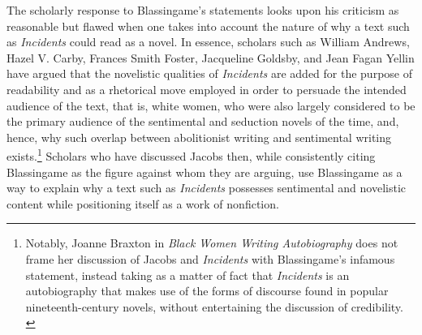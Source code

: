 The scholarly response to Blassingame's statements looks upon his criticism as reasonable but flawed when one takes into account the nature of why a text such as \textit{Incidents} could read as a novel. In essence, scholars such as William Andrews, Hazel V. Carby, Frances Smith Foster, Jacqueline Goldsby, and Jean Fagan Yellin have argued that the novelistic qualities of \textit{Incidents} are added for the purpose of readability and as a rhetorical move employed in order to persuade the intended audience of the text, that is, white women, who were also largely considered to be the primary audience of the sentimental and seduction novels of the time, and, hence, why such overlap between abolitionist writing and sentimental writing exists.\footnote{Notably, Joanne Braxton in \textit{Black Women Writing Autobiography} does not frame her discussion of Jacobs and \textit{Incidents} with Blassingame's infamous statement, instead taking as a matter of fact that \textit{Incidents} is an autobiography that makes use of the forms of discourse found in popular nineteenth-century novels, without entertaining the discussion of credibility. \autocite{braxton_black_1989}} Scholars who have discussed Jacobs then, while consistently citing Blassingame as the figure against whom they are arguing, use Blassingame as a way to explain why a text such as \textit{Incidents} possesses sentimental and novelistic content while positioning itself as a work of nonfiction. 


